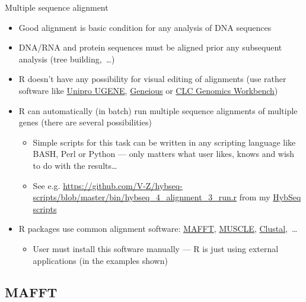 \documentclass[compress, xelatex, 11pt, xcolor=svgnames, aspectratio=169, url={hyphens, lowtilde}]{beamer}
\begin{document}
\begin{frame}{Multiple sequence alignment}
	\label{alignment}
	\begin{itemize}
		\item Good alignment is basic condition for any analysis of DNA sequences
		\item DNA/RNA and protein sequences must be aligned prior any subsequent analysis (tree building,~\ldots)
		\item R doesn't have any possibility for visual editing of alignments (use rather software like \href{https://ugene.net/}{Unipro UGENE}, \href{https://www.geneious.com/}{Geneious} or \href{https://digitalinsights.qiagen.com/products-overview/analysis-and-visualization/qiagen-clc-genomics-workbench/}{CLC Genomics Workbench})
		\item R can automatically (in batch) run multiple sequence alignments of multiple genes (there are several possibilities)
		\begin{itemize}
			\item Simple scripts for this task can be written in any scripting language like BASH, Perl or Python --- only matters what user likes, knows and wish to do with the results\ldots
			\item See e.g. \url{https://github.com/V-Z/hybseq-scripts/blob/master/bin/hybseq_4_alignment_3_run.r} from my \href{https://github.com/V-Z/hybseq-scripts}{HybSeq scripts}
		\end{itemize}
		\item R packages use common alignment software: \href{https://mafft.cbrc.jp/alignment/software/}{MAFFT}, \href{https://www.drive5.com/muscle/}{MUSCLE}, \href{http://clustal.org/}{Clustal},~\ldots
		\begin{itemize}
			\item User must install this software manually --- R is just using external applications (in the examples shown)
		\end{itemize}
	\end{itemize}
\end{frame}

\subsection{MAFFT}
\end{document}
